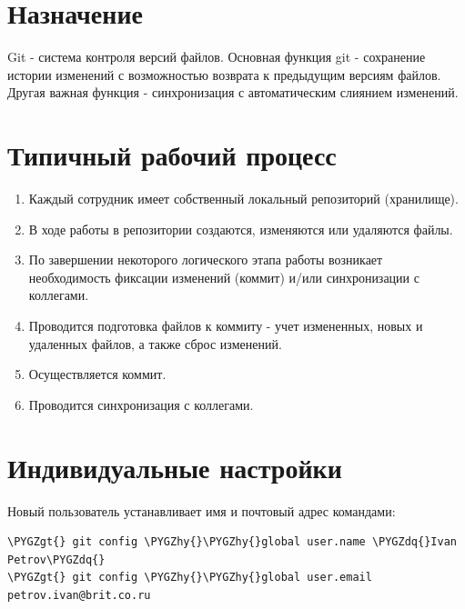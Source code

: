 \documentclass[a4paper,12pt,oneside]{sphinxmanual}
\def\PYGZgt{\char`\>}
\def\PYGZhy{\char`\-}
\def\PYGZdq{\char`\"}
\begin{document}
\section{Назначение}
\label{git_short_manual:what-is-git}\label{git_short_manual:id1}
Git - система контроля версий файлов. Основная функция git - сохранение истории изменений с возможностью возврата к предыдущим версиям файлов. Другая важная функция - синхронизация с автоматическим слиянием изменений.


\section{Типичный рабочий процесс}
\label{git_short_manual:id2}\label{git_short_manual:git-pipeline}\begin{enumerate}
\item {} 
Каждый сотрудник имеет собственный локальный репозиторий (хранилище).

\item {} 
В ходе работы в репозитории создаются, изменяются или удаляются файлы.

\item {} 
По завершении некоторого логического этапа работы возникает необходимость фиксации изменений (коммит) и/или синхронизации с коллегами.

\item {} 
Проводится подготовка файлов к коммиту - учет измененных, новых и удаленных файлов, а также сброс изменений.

\item {} 
Осуществляется коммит.

\item {} 
Проводится синхронизация с коллегами.

\end{enumerate}


\section{Индивидуальные настройки}
\label{git_short_manual:id3}\label{git_short_manual:git-config}\label{git_short_manual:index-1}
Новый пользователь устанавливает имя и почтовый адрес командами:

\begin{Verbatim}[commandchars=\\\{\}]
\PYGZgt{} git config \PYGZhy{}\PYGZhy{}global user.name \PYGZdq{}Ivan Petrov\PYGZdq{}
\PYGZgt{} git config \PYGZhy{}\PYGZhy{}global user.email petrov.ivan@brit.co.ru
\end{Verbatim}
\end{document}
